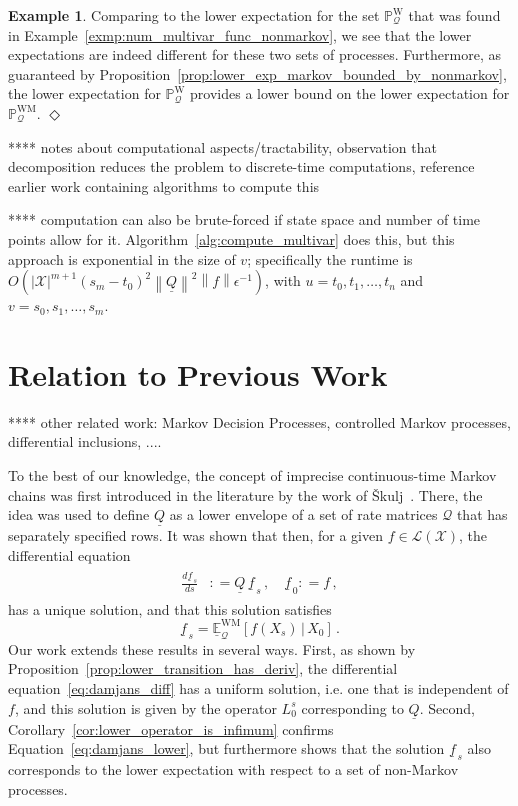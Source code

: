 \documentclass[10pt,a4paper]{paper}
\theoremstyle{definition}
\newtheorem{exmp}{Example}%
\newcommand{\states}{\mathcal{X}}
\newcommand{\processes}{\mathbb{P}}
\newcommand{\wprocesses}{\processes^{\mathrm{W}}}
\newcommand{\wmprocesses}{\processes^{\mathrm{WM}}}
\newcommand{\gambles}{\mathcal{L}}
\newcommand{\gamblesX}{\gambles(\states)}
\newcommand{\rateset}{\mathcal{Q}}
\newcommand{\lrate}{\underline{Q}}
\newcommand{\norm}[1]{\left\lVert #1 \right\rVert}
\newcommand{\coloneqq}{:\!=}
\newcommand{\exampleend}{\hfill$\Diamond$}
\begin{document}
\begin{exmp}
Comparing to the lower expectation for the set $\wprocesses_\rateset$ that was found in Example~\ref{exmp:num_multivar_func_nonmarkov}, we see that the lower expectations are indeed different for these two sets of processes. Furthermore, as guaranteed by Proposition~\ref{prop:lower_exp_markov_bounded_by_nonmarkov}, the lower expectation for $\wprocesses_\rateset$ provides a lower bound on the lower expectation for $\wmprocesses_\rateset$.
\exampleend
\end{exmp}

**** notes about computational aspects/tractability, observation that decomposition reduces the problem to discrete-time computations, reference earlier work containing algorithms to compute this

**** computation can also be brute-forced if state space and number of time points allow for it. Algorithm~\ref{alg:compute_multivar} does this, but this approach is exponential in the size of $v$; specifically the runtime is $O\left({\vert\states\vert}^{m+1}(s_m-t_0)^2\norm{\lrate}^2\norm{f}\epsilon^{-1}\right)$, with $u=t_0,t_1,\ldots,t_n$ and $v=s_0,s_1,\ldots,s_m$.

\section{Relation to Previous Work}\label{sec:prev_work}

**** other related work: Markov Decision Processes, controlled Markov processes, differential inclusions, ....

To the best of our knowledge, the concept of imprecise continuous-time Markov chains was first introduced in the literature by the work of {\v{S}}kulj~\cite{Skulj:2015cq}. There, the idea was used to define $\lrate$ as a lower envelope of a set of rate matrices $\rateset$ that has separately specified rows. It was shown that then, for a given $f\in\gamblesX$, the differential equation
\begin{align}\label{eq:damjans_diff}
\begin{split}
\frac{d \underline{f}_{\,s}}{d s} &\coloneqq \lrate\,\underline{f}_{\,s}\,,\quad
\underline{f}_{\,0} \coloneqq f\,,
\end{split}
\end{align}
has a unique solution, and that this solution satisfies
\begin{equation}\label{eq:damjans_lower}
\underline{f}_{\,s} = \underline{\mathbb{E}}_{\rateset}^{\mathrm{WM}}[f(X_s)\,\vert\,X_0]\,.
\end{equation}
Our work extends these results in several ways. First, as shown by Proposition~\ref{prop:lower_transition_has_deriv}, the differential equation~\eqref{eq:damjans_diff} has a uniform solution, i.e. one that is independent of $f$, and this solution is given by the operator $L_0^s$ corresponding to $\lrate$. Second, Corollary~\ref{cor:lower_operator_is_infimum} confirms Equation~\eqref{eq:damjans_lower}, but furthermore shows that the solution $\underline{f}_{\,s}$ also corresponds to the lower expectation with respect to a set of non-Markov processes.
\end{document}
